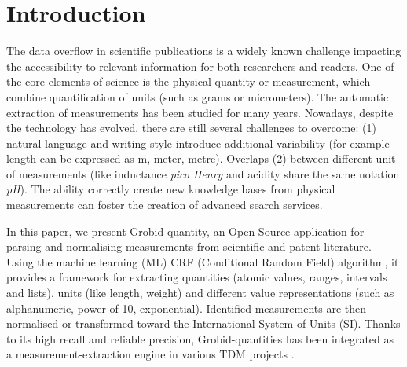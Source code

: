 \documentclass[sigplan, anonymous, review]{acmart}
\begin{document}


\maketitle

\section{Introduction}

The data overflow in scientific publications is a widely known challenge impacting the accessibility to relevant information for both researchers and readers. 
One of the core elements of science is the physical quantity or measurement, which combine quantification of units (such as grams or micrometers). The automatic extraction of measurements has been studied for many years. Nowadays, despite the technology has evolved, there are still several challenges to overcome: (1) natural language and writing style introduce additional variability (for example length can be expressed as m, meter, metre). Overlaps (2) between different unit of measurements (like inductance \textit{pico Henry} and acidity share the same notation \textit{pH}). The ability correctly create new knowledge bases from physical measurements can foster the creation of advanced search services. 

In this paper, we present Grobid-quantity, an Open Source application \cite{grobid-quantities} for parsing and normalising measurements from scientific and patent literature. Using the machine learning (ML) CRF (Conditional Random Field) algorithm, it provides a framework for extracting quantities (atomic values, ranges, intervals and lists), units (like length, weight) and different value representations (such as alphanumeric, power of 10, exponential). Identified measurements are then normalised or transformed toward the International System of Units (SI). Thanks to its high recall and reliable precision, Grobid-quantities has been integrated as a measurement-extraction engine in various TDM projects \cite{foppiano2019proposal}.
\end{document}
